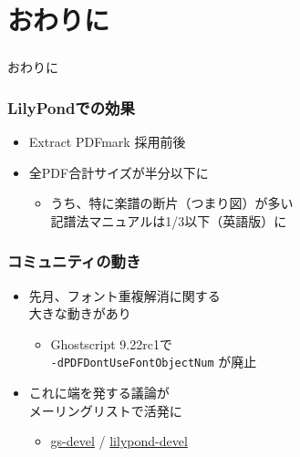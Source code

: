 \documentclass[unicode,17pt]{beamer}
\begin{document}
\section{おわりに}
\begin{frame}\frametitle{}
  \centering
  おわりに
\end{frame}

\begin{frame}\frametitle{LilyPondでの効果}
  \begin{itemize}
  \item Extract PDFmark 採用前後
  \end{itemize}
  \begin{itemize}
  \item 全PDF合計サイズが半分以下に
    \begin{itemize}
    \item うち、特に楽譜の断片（つまり図）が多い\\
      記譜法マニュアルは1/3以下（英語版）に
    \end{itemize}
  \end{itemize}
\end{frame}

\begin{frame}[fragile]\frametitle{コミュニティの動き}
  \begin{itemize}
  \item 先月、フォント重複解消に関する\\
    大きな動きがあり
    \begin{itemize}
    \item Ghostscript 9.22rc1で\\
      \verb|-dPDFDontUseFontObjectNum| が廃止
    \end{itemize}
  \item これに端を発する議論が\\
    メーリングリストで活発に
    \begin{itemize}
    \item
\href{https://ghostscript.com/pipermail/gs-devel/2017-September/date.html}%
     {gs-devel} /
\href{http://lists.gnu.org/archive/html/lilypond-devel/2017-09/index.html}%
     {lilypond-devel}
    \end{itemize}
  \end{itemize}
\end{frame}
\end{document}
